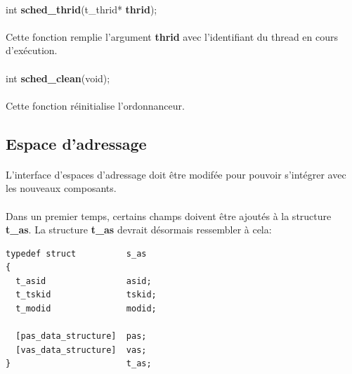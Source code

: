 \documentclass[10pt,a4wide]{article}
\begin{document}
\paragraph{}

\hspace{1.5cm}int \textbf{sched\_thrid}(t\_thrid* \textbf{thrid});

\paragraph{}

Cette fonction remplie l'argument \textbf{thrid} avec l'identifiant du
thread en cours d'ex\'ecution.

\paragraph{}

\hspace{1.5cm}int \textbf{sched\_clean}(void);

\paragraph{}

Cette fonction r\'einitialise l'ordonnanceur.

\subsection{Espace d'adressage}

\paragraph{}

L'interface d'espaces d'adressage doit \^etre modif\'ee pour pouvoir
s'int\'egrer avec les nouveaux composants.

\paragraph{}

Dans un premier temps, certains champs doivent \^etre ajout\'es \`a
la structure \textbf{t\_as}. La structure \textbf{t\_as} devrait
d\'esormais ressembler \`a cela:

\begin{verbatim}
typedef struct          s_as
{
  t_asid                asid;
  t_tskid               tskid;
  t_modid               modid;

  [pas_data_structure]  pas;
  [vas_data_structure]  vas;
}                       t_as;
\end{verbatim}
\end{document}
